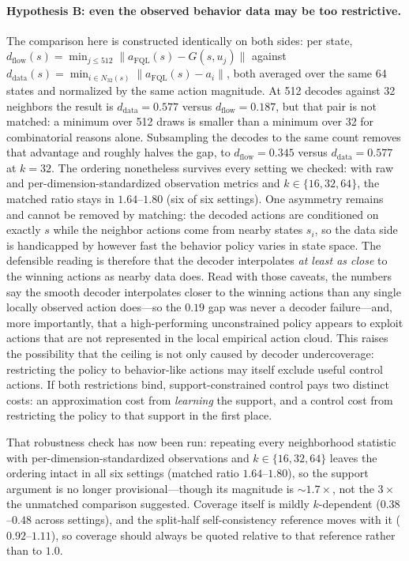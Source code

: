 \documentclass{article}
\begin{document}
\paragraph{Hypothesis B: even the observed behavior data may be too restrictive.} The comparison here is constructed identically on both sides: per state, $d_{\mathrm{flow}}(s)=\min_{j\le 512}\|a_{\mathrm{FQL}}(s)-G(s,u_j)\|$ against $d_{\mathrm{data}}(s)=\min_{i\in N_{32}(s)}\|a_{\mathrm{FQL}}(s)-a_i\|$, both averaged over the same 64 states and normalized by the same action magnitude. At 512 decodes against 32 neighbors the result is $d_{\mathrm{data}}=0.577$ versus $d_{\mathrm{flow}}=0.187$, but that pair is not matched: a minimum over 512 draws is smaller than a minimum over 32 for combinatorial reasons alone. Subsampling the decodes to the same count removes that advantage and roughly halves the gap, to $d_{\mathrm{flow}}=0.345$ versus $d_{\mathrm{data}}=0.577$ at $k=32$. The ordering nonetheless survives every setting we checked: with raw and per-dimension-standardized observation metrics and $k\in\{16,32,64\}$, the matched ratio stays in $1.64$--$1.80$ (six of six settings). One asymmetry remains and cannot be removed by matching: the decoded actions are conditioned on exactly $s$ while the neighbor actions come from nearby states $s_i$, so the data side is handicapped by however fast the behavior policy varies in state space. The defensible reading is therefore that the decoder interpolates \emph{at least as close} to the winning actions as nearby data does. Read with those caveats, the numbers say the smooth decoder interpolates closer to the winning actions than any single locally observed action does---so the $0.19$ gap was never a decoder failure---and, more importantly, that a high-performing unconstrained policy appears to exploit actions that are not represented in the local empirical action cloud. This raises the possibility that the ceiling is not only caused by decoder undercoverage: restricting the policy to behavior-like actions may itself exclude useful control actions. If both restrictions bind, support-constrained control pays two distinct costs: an approximation cost from \emph{learning} the support, and a control cost from restricting the policy to that support in the first place.

That robustness check has now been run: repeating every neighborhood statistic with per-dimension-standardized observations and $k\in\{16,32,64\}$ leaves the ordering intact in all six settings (matched ratio $1.64$--$1.80$), so the support argument is no longer provisional---though its magnitude is $\sim\!1.7\times$, not the $3\times$ the unmatched comparison suggested. Coverage itself is mildly $k$-dependent ($0.38$--$0.48$ across settings), and the split-half self-consistency reference moves with it ($0.92$--$1.11$), so coverage should always be quoted relative to that reference rather than to $1.0$.
\end{document}
